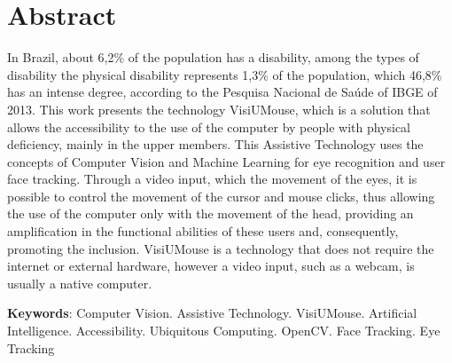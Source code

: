 \chapter*{Abstract}
\begin{singlespace}
{\fontsize{12pt}{\baselineskip} \selectfont \noindent
In Brazil, about 6,2\% of the population has a disability, among the types of disability the physical disability represents 1,3\% of the population, which 46,8\% has an intense degree, according to the Pesquisa  Nacional de Saúde of IBGE of 2013. This work presents the technology VisiUMouse, which is a solution that allows the accessibility to the use of the computer by people with physical deficiency, mainly in the upper members. This Assistive Technology uses the concepts of Computer Vision and Machine Learning for eye recognition and user face tracking. Through a video input, which the movement of the eyes, it is possible to control the movement of the cursor and mouse clicks, thus allowing the use of the computer only with the movement of the head, providing an amplification in the functional abilities of these users and, consequently, promoting the inclusion. VisiUMouse is a technology that does not require the internet or external hardware, however a video input, such as a webcam, is usually a native computer.
}
\end{singlespace}

\begin{singlespace}
\noindent \onehalfspacing
\textbf{Keywords}: Computer Vision. Assistive Technology. VisiUMouse. Artificial Intelligence. Accessibility. Ubiquitous Computing. OpenCV. Face Tracking. Eye Tracking
\end{singlespace}